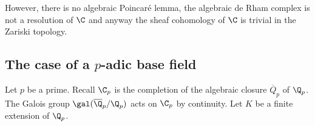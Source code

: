 \documentclass[a4paper]{article}
\begin{document}
However, there is no algebraic Poincaré lemma, the algebraic de Rham complex is not a resolution of \(\C\) and anyway the sheaf cohomology of \(\C\) is trivial in the Zariski topology.

\subsection{The case of a \(p\)-adic base field}

Let \(p\) be a prime. Recall \(\C_p\) is the completion of the algebraic closure \(\overline Q_p\) of \(\Q_p\). The Galois group \(\gal(\overline \Q_p/\Q_p)\) acts on \(\C_p\) by continuity. Let \(K\) be a finite extension of \(\Q_p\).



\printindex
\end{document}
